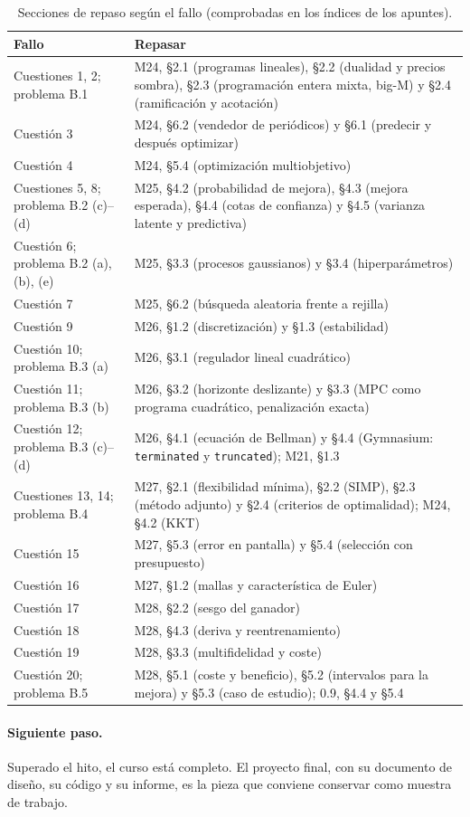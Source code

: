 \begin{table}[h]
\centering\small
\caption{Secciones de repaso según el fallo (comprobadas en los índices de los apuntes).}\label{tab:repaso}
\begin{tabularx}{\textwidth}{@{}>{\raggedright\arraybackslash}p{4.2cm}X@{}}
\toprule
Fallo & Repasar \\
\midrule
Cuestiones 1, 2; problema B.1 & M24, §2.1 (programas lineales), §2.2 (dualidad y precios sombra), §2.3 (programación entera mixta, big-M) y §2.4 (ramificación y acotación) \\
Cuestión 3 & M24, §6.2 (vendedor de periódicos) y §6.1 (predecir y después optimizar) \\
Cuestión 4 & M24, §5.4 (optimización multiobjetivo) \\
Cuestiones 5, 8; problema B.2 (c)--(d) & M25, §4.2 (probabilidad de mejora), §4.3 (mejora esperada), §4.4 (cotas de confianza) y §4.5 (varianza latente y predictiva) \\
Cuestión 6; problema B.2 (a), (b), (e) & M25, §3.3 (procesos gaussianos) y §3.4 (hiperparámetros) \\
Cuestión 7 & M25, §6.2 (búsqueda aleatoria frente a rejilla) \\
Cuestión 9 & M26, §1.2 (discretización) y §1.3 (estabilidad) \\
Cuestión 10; problema B.3 (a) & M26, §3.1 (regulador lineal cuadrático) \\
Cuestión 11; problema B.3 (b) & M26, §3.2 (horizonte deslizante) y §3.3 (MPC como programa cuadrático, penalización exacta) \\
Cuestión 12; problema B.3 (c)--(d) & M26, §4.1 (ecuación de Bellman) y §4.4 (Gymnasium: \texttt{terminated} y \texttt{truncated}); M21, §1.3 \\
Cuestiones 13, 14; problema B.4 & M27, §2.1 (flexibilidad mínima), §2.2 (SIMP), §2.3 (método adjunto) y §2.4 (criterios de optimalidad); M24, §4.2 (KKT) \\
Cuestión 15 & M27, §5.3 (error en pantalla) y §5.4 (selección con presupuesto) \\
Cuestión 16 & M27, §1.2 (mallas y característica de Euler) \\
Cuestión 17 & M28, §2.2 (sesgo del ganador) \\
Cuestión 18 & M28, §4.3 (deriva y reentrenamiento) \\
Cuestión 19 & M28, §3.3 (multifidelidad y coste) \\
Cuestión 20; problema B.5 & M28, §5.1 (coste y beneficio), §5.2 (intervalos para la mejora) y §5.3 (caso de estudio); 0.9, §4.4 y §5.4 \\
\bottomrule
\end{tabularx}
\end{table}

\paragraph{Siguiente paso.} Superado el hito, el curso está completo. El proyecto final, con su documento de diseño, su código y su informe, es la pieza que conviene conservar como muestra de trabajo.
